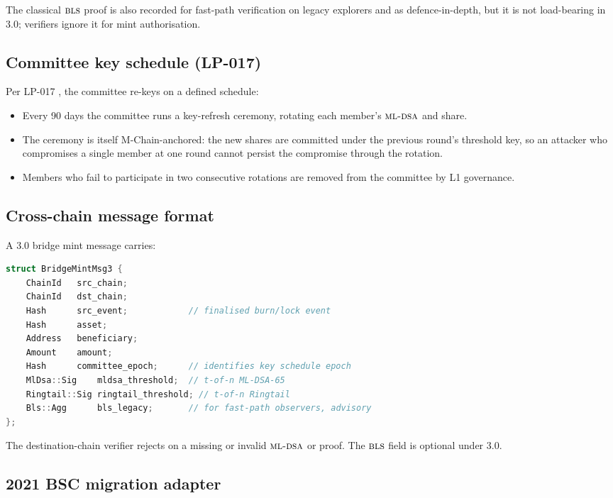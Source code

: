 The classical $\textsc{bls}{}$ proof is also recorded for fast-path
verification on legacy explorers and as defence-in-depth, but
it is not load-bearing in 3.0; verifiers ignore it for mint
authorisation.

\subsection{Committee key schedule (LP-017)}

Per LP-017 \cite{lp-017}, the committee re-keys on a defined
schedule:

\begin{itemize}[leftmargin=1.2em]
  \item Every 90 days the committee runs a key-refresh ceremony,
        rotating each member's $\textsc{ml-dsa}{}$ and \Ringtail{} share.
  \item The ceremony is itself M-Chain-anchored: the new shares
        are committed under the previous round's threshold key,
        so an attacker who compromises a single member at one
        round cannot persist the compromise through the rotation.
  \item Members who fail to participate in two consecutive rotations
        are removed from the committee by L1 governance.
\end{itemize}

\subsection{Cross-chain message format}

A 3.0 bridge mint message carries:

\begin{lstlisting}[language=C++,caption={Bridge mint message v3}]
struct BridgeMintMsg3 {
    ChainId   src_chain;
    ChainId   dst_chain;
    Hash      src_event;            // finalised burn/lock event
    Hash      asset;
    Address   beneficiary;
    Amount    amount;
    Hash      committee_epoch;      // identifies key schedule epoch
    MlDsa::Sig    mldsa_threshold;  // t-of-n ML-DSA-65
    Ringtail::Sig ringtail_threshold; // t-of-n Ringtail
    Bls::Agg      bls_legacy;       // for fast-path observers, advisory
};
\end{lstlisting}

The destination-chain verifier rejects on a missing or invalid
$\textsc{ml-dsa}{}$ or \Ringtail{} proof. The $\textsc{bls}{}$ field is optional under
3.0.

\subsection{2021 BSC migration adapter}

